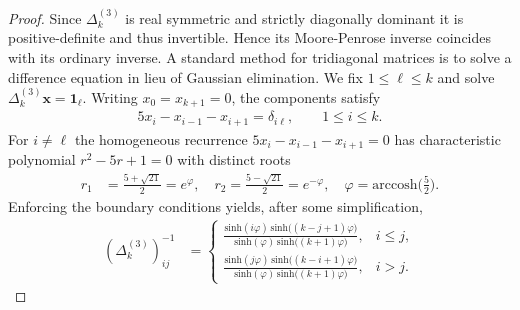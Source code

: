 \documentclass[11pt,a4paper]{amsart}
\begin{document}
\begin{proof}
    Since $\Delta_k^{(3)}$ is real symmetric and strictly diagonally dominant it is positive-definite and thus invertible. Hence its Moore-Penrose inverse coincides with its ordinary inverse. A standard method for tridiagonal matrices is to solve a difference equation in lieu of Gaussian elimination. We fix $1\le\ell\le k$ and solve $\Delta_k^{(3)}\mathbf{x}=\mathbf{1}_\ell$. Writing $x_0=x_{k+1}=0$, the components satisfy
        \begin{align*}
            5x_i-x_{i-1}-x_{i+1}=\delta_{i\ell},
            \qquad 1\le i\le k .
        \end{align*}
    For $i\neq\ell$ the homogeneous recurrence $5x_i-x_{i-1}-x_{i+1}=0$ has characteristic polynomial $r^{2}-5r+1=0$ with distinct roots 
        \begin{align*}
            r_1 &= \frac{5 + \sqrt{21}}{2} = e^\varphi, \quad r_2 = \frac{5 - \sqrt{21}}{2} = e^{-\varphi},\quad  \varphi = \mathrm{arccosh}\bigl(\tfrac{5}{2}\bigr).
        \end{align*}
    Enforcing the boundary conditions yields, after some simplification,
        \begin{align}\label{eq:closed-form-asym}
            (\Delta_k^{(3)})^{-1}_{ij}
            &=
            \begin{cases}
            \displaystyle
            \frac{\mathrm{sinh}(i\varphi)\,\mathrm{sinh}\bigl((k-j+1)\varphi\bigr)}
                {\mathrm{sinh}(\varphi)\,\mathrm{sinh}\bigl((k+1)\varphi\bigr)},
            & i \le j,\\
            \displaystyle
            \frac{\mathrm{sinh}(j\varphi)\,\mathrm{sinh}\bigl((k-i+1)\varphi\bigr)}
                {\mathrm{sinh}(\varphi)\,\mathrm{sinh}\bigl((k+1)\varphi\bigr)},
            & i > j.
            \end{cases}
        \end{align}


\end{proof}
\end{document}
